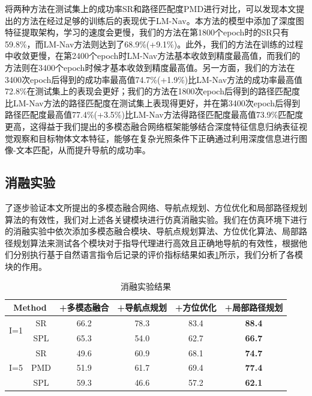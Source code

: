 将两种方法在测试集上的成功率SR和路径匹配度PMD进行对比，可以发现本文提出的方法在经过足够的训练后的表现优于LM-Nav。本方法的模型中添加了深度图特征提取架构，学习的速度会更慢，我们的方法在第1800个epoch时的SR只有59.8\%，而LM-Nav方法则达到了68.9\%(+9.1\%)。此外，我们的方法在训练的过程中收敛更慢，在第2400个epoch时LM-Nav方法基本收敛到精度最高值，而我们的方法则在3400个epoch时候才基本收敛到精度最高值。另一方面，我们的方法在3400次epoch后得到的成功率最高值74.7\%(+1.9\%)比LM-Nav方法的成功率最高值72.8\%在测试集上的表现会更好；我们的方法在1800次epoch后得到的路径匹配度比LM-Nav方法的路径匹配度在测试集上表现得更好，并在第3400次epoch后得到路径匹配度最高值77.4\%(+3.5\%)比LM-Nav方法得路径匹配度最高值73.9\%匹配度更高，这得益于我们提出的多模态融合网络框架能够结合深度特征信息归纳表征视觉观察和目标物体文本特征，能够在复杂光照条件下正确通过利用深度信息进行图像-文本匹配，从而提升导航的成功率。




\subsection{消融实验}

了逐步验证本文所提出的多模态融合网络、导航点规划、方位优化和局部路径规划算法的有效性，我们对上述各关键模块进行仿真消融实验。我们在仿真环境下进行的消融实验中依次添加多模态融合模块、导航点规划算法、方位优化算法、局部路径规划算法来测试各个模块对于指导代理进行高效且正确地导航的有效性，根据他们分别执行基于自然语言指令后记录的评价指标结果如表\ref{Ablationtable}所示，我们分析了各模块的作用。

\begin{table}[]
    \caption{\label{Ablationtable}消融实验结果}
    \centering
        \begin{tabular}{cc|c|c|c|c}
        \hline
        \multicolumn{2}{c|}{Method}                     & +多模态融合 & +导航点规划 & +方位优化 & +局部路径规划 \\ \hline
        \multicolumn{1}{c|}{\multirow{2}{*}{I=1}} & SR  & 66.2   & 78.3   & 83.4  & \textbf{88.4}    \\
        \multicolumn{1}{c|}{}                     & SPL & 65.3   & 54.0   & 62.7  & \textbf{66.7}    \\ \hline
        \multicolumn{1}{c|}{\multirow{3}{*}{I=5}} & SR  & 49.6   & 60.9   & 68.1  & \textbf{74.7}    \\
        \multicolumn{1}{c|}{}                     & PMD & 51.9   & 61.7   & 69.4  & \textbf{77.4}    \\
        \multicolumn{1}{c|}{}                     & SPL & 59.3   & 46.6   & 57.2  & \textbf{62.1}    \\ \hline
        \end{tabular}
    \end{table}


